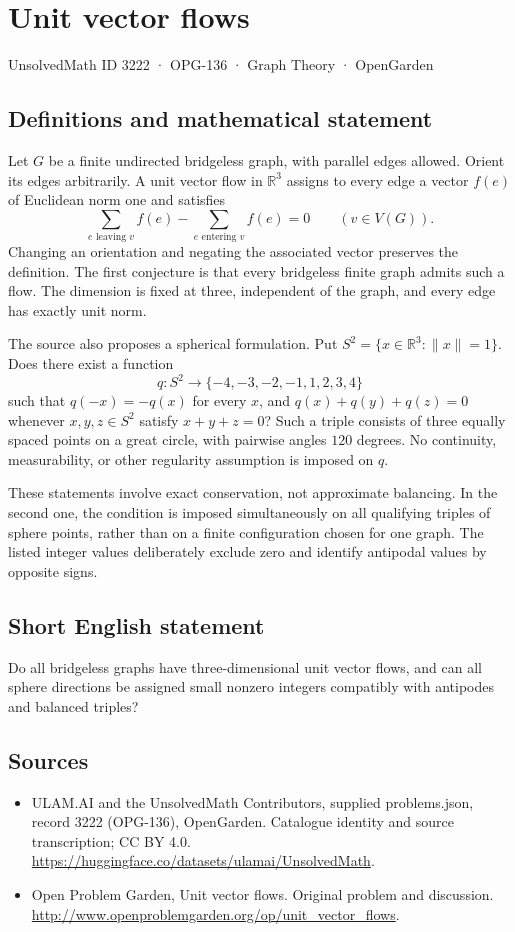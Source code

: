 \documentclass[11pt,a4paper]{article}
\begin{document}
\section*{Unit vector flows}\label{3222}
{\small UnsolvedMath ID 3222 · OPG-136 · Graph Theory · OpenGarden}
\subsection{Definitions and mathematical statement}
Let $G$ be a finite undirected bridgeless graph, with parallel edges allowed. Orient its edges arbitrarily. A unit vector flow in $\mathbb R^3$ assigns to every edge a vector $f(e)$ of Euclidean norm one and satisfies
\[
       \sum_{e\text{ leaving }v}f(e)
       -\sum_{e\text{ entering }v}f(e)=0
       \qquad(v\in V(G)).
\]
Changing an orientation and negating the associated vector preserves the definition. The first conjecture is that every bridgeless finite graph admits such a flow. The dimension is fixed at three, independent of the graph, and every edge has exactly unit norm.

The source also proposes a spherical formulation. Put $S^2=\{x\in\mathbb R^3:\|x\|=1\}$. Does there exist a function
\[
 q:S^2\longrightarrow\{-4,-3,-2,-1,1,2,3,4\}
\]
such that $q(-x)=-q(x)$ for every $x$, and $q(x)+q(y)+q(z)=0$ whenever $x,y,z\in S^2$ satisfy $x+y+z=0$? Such a triple consists of three equally spaced points on a great circle, with pairwise angles $120$ degrees. No continuity, measurability, or other regularity assumption is imposed on $q$.

These statements involve exact conservation, not approximate balancing. In the second one, the condition is imposed simultaneously on all qualifying triples of sphere points, rather than on a finite configuration chosen for one graph. The listed integer values deliberately exclude zero and identify antipodal values by opposite signs.
\subsection{Short English statement}
Do all bridgeless graphs have three-dimensional unit vector flows, and can all sphere directions be assigned small nonzero integers compatibly with antipodes and balanced triples?
\subsection{Sources}
\begin{itemize}
\item[S1] ULAM.AI and the UnsolvedMath Contributors, supplied problems.json, record 3222 (OPG-136), OpenGarden. Catalogue identity and source transcription; CC BY 4.0.
\url{https://huggingface.co/datasets/ulamai/UnsolvedMath}.
\item[S2] Open Problem Garden, Unit vector flows. Original problem and discussion.
\url{http://www.openproblemgarden.org/op/unit_vector_flows}.
\end{itemize}
\end{document}
